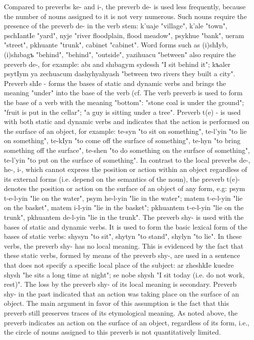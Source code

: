 \documentclass[a4paper,12pt]{book}
\newcommand{\1}[1]{\textbf{\emph{#1}}} %
\newcommand{\2}[1]{\textbf{[#1]}} %
\newcommand{\3}[1]{\fontsize{11pt}{0cm}\textbf{\emph{#1}}} %
\newcommand{\4}[1]{\fontsize{10pt}{0cm}\emph{#1}}	%
\newcommand{\5}[1]{\textbf{/#1/}} %
\newcommand{\6}[1]{\textbf{[#1]}} %
\newcommand{\7}[1]{\fontsize{12pt}{0cm}\emph{#1}} %
\newcommand{\8}[1]{\fontsize{12pt}{0cm}`#1'} %
\newcommand{\9}[1]{\fontsize{12pt}{0cm}(lit. `#1')} %
\begin{document}
Compared to preverbs ke- and i-, the preverb de- is used less frequently, because the number of nouns assigned to it is not very numerous. Such nouns require the presence of the preverb de- in the verb stem: k'uaje "village", k'ale "town", pschIantIe "yard", nyje "river floodplain, flood meadow", psykhue "bank", ueram "street", pkhuante "trunk", cabinet "cabinet". Word forms such as (i)shIyb, (i)shıbagъ "behind", "behind", "outside", yazihuacu "between" also require the preverb de-, for example: abı and shıbagym sydessh "I sit behind it"; kъaler psytIym ya zechuacum dashyhyahyash "between two rivers they built a city".
Preverb shIe - forms the bases of static and dynamic verbs and brings the meaning "under" into the base of the verb (cf. The verb preverb is used to form the base of a verb with the meaning "bottom": "stone coal is under the ground"; "fruit is put in the cellar"; "a guy is sitting under a tree".
Preverb t(e) - is used with both static and dynamic verbs and indicates that the action is performed on the surface of an object, for example: te-syn "to sit on something", te-l'yin "to lie on something", te-kIyn "to come off the surface of something", te-hyn "to bring something off the surface", te-shen "to do something on the surface of something", te-l'yin "to put on the surface of something".
In contrast to the local preverbs de-, he-, i-, which cannot express the position or action within an object regardless of its external forms (i.e. depend on the semantics of the noun), the preverb t(e)- denotes the position or action on the surface of an object of any form, e.g: psym t-e-l-yin "lie on the water", psym he-l-yin "lie in the water"; matem t-e-l-yin "lie on the basket", matem i-l-yin "lie in the basket"; pkhuantem t-e-l-yin "lie on the trunk", pkhuantem de-l-yin "lie in the trunk".
The preverb shy- is used with the bases of static and dynamic verbs. It is used to form the basic lexical form of the bases of static verbs: shysyn "to sit", shytyn "to stand", shylyn "to lie".
In these verbs, the preverb shy- has no local meaning. This is evidenced by the fact that these static verbs, formed by means of the preverb shy-, are used in a sentence that does not specify a specific local place of the subject: ar zheshkIe kuedre shysh "he sits a long time at night"; se nobe shysh "I sit today (i.e. do not work, rest)".
The loss by the preverb shy- of its local meaning is secondary. Preverb shy- in the past indicated that an action was taking place on the surface of an object. The main argument in favor of this assumption is the fact that this preverb still preserves traces of its etymological meaning. As noted above, the preverb indicates an action on the surface of an object, regardless of its form, i.e., the circle of nouns assigned to this preverb is not quantitatively limited.
\end{document}
